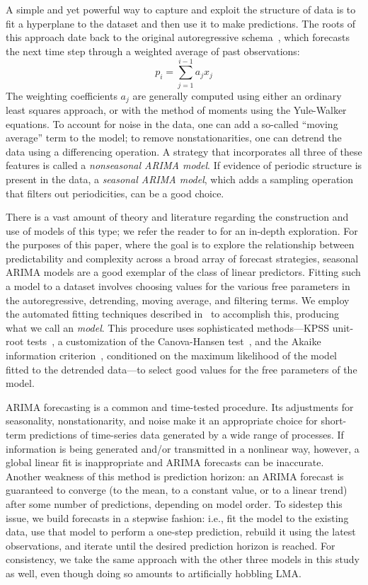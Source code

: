 A simple and yet powerful way to capture and exploit the structure of
data is to fit a hyperplane to the dataset and then use it to make
predictions.  The roots of this approach date back to the original
autoregressive schema~\cite{weigend93}, which forecasts the next time
step through a weighted average of past observations: $$p_i =
\sum_{j=1}^{i-1} a_j x_j$$ The weighting coefficients $a_j$ are
generally computed using either an ordinary least squares approach, or
with the method of moments using the Yule-Walker equations.  To
account for noise in the data, one can add a so-called ``moving
average'' term to the model; to remove nonstationarities, one can
detrend the data using a differencing operation.  A strategy that
incorporates all three of these features is called a \emph{nonseasonal
  ARIMA model}.  If evidence of periodic structure is present in the
data, a \emph{seasonal ARIMA model}, which adds a sampling operation
that filters out periodicities, can be a good choice.

There is a vast amount of theory and literature regarding the
construction and use of models of this type; we refer the reader to
\cite{davislinearts} for an in-depth exploration.  For the purposes of
this paper, where the goal is to explore the relationship between
predictability and complexity across a broad array of forecast
strategies, seasonal ARIMA models are a good exemplar of the class of
linear predictors.  Fitting such a model to a dataset involves
choosing values for the various free parameters in the autoregressive,
detrending, moving average, and filtering terms.  We employ the
automated fitting techniques described in~\cite{autoARIMA} to
accomplish this, producing what we call an \emph{\arima model}.
This procedure uses sophisticated methods---KPSS unit-root
tests~\cite{KPSSunit}, a customization of the Canova-Hansen
test~\cite{Canova1995}, and the Akaike information
criterion~\cite{akaike1974}, conditioned on the maximum likelihood of
the model fitted to the detrended data---to select good values for the
free parameters of the \arima model.

ARIMA forecasting is a common and time-tested procedure.  Its
adjustments for seasonality, nonstationarity, and noise make it an
appropriate choice for short-term predictions of time-series data
generated by a wide range of processes.  If information is being
generated and/or transmitted in a nonlinear way, however, a global
linear fit is inappropriate and ARIMA forecasts can be inaccurate.
Another weakness of this method is prediction horizon: an ARIMA
forecast is guaranteed to converge (to the mean, to a constant value,
or to a linear trend) after some number of predictions, depending on
model order.  To sidestep this issue, we build forecasts in a stepwise
fashion: i.e., fit the \arima model to the existing data, use that
model to perform a one-step prediction, rebuild it using the latest
observations, and iterate until the desired prediction horizon is
reached.  For consistency, we take the same approach with the other
three models in this study as well, even though doing so amounts to
artificially hobbling LMA.

